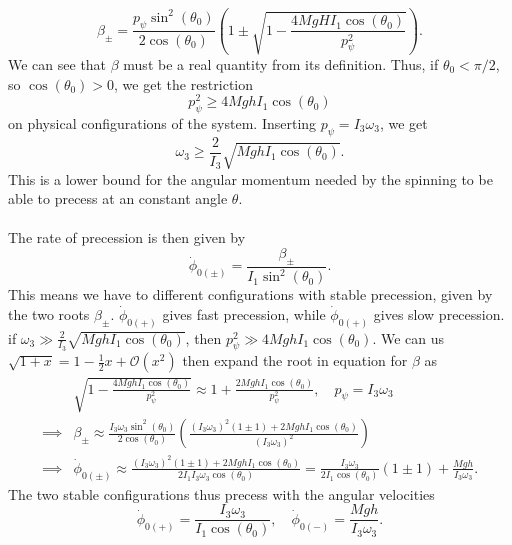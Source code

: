 \documentclass{article}
\begin{document}
        \begin{equation*}
            \beta_\pm = \frac{p_\psi \sin^2(\theta_0)}{2 \cos(\theta_0)} \left( 1 \pm \sqrt{1 - \frac{4 M g H I_1 \cos(\theta_0)}{p_\psi^2}} \right).
        \end{equation*}
        We can see that $\beta$ must be a real quantity from its definition. Thus, if $\theta_0 < \pi / 2$, so $\cos(\theta_0) > 0$, we get the restriction
        \begin{equation*}
            p_\psi^2 \geq 4 M g h I_1 \cos(\theta_0)
        \end{equation*}
        on physical configurations of the system. Inserting $p_\psi = I_3 \omega_3$, we get
        \begin{equation*}
            \omega_3 \geq \frac{2}{I_3} \sqrt{MghI_1 \cos(\theta_0)}.
        \end{equation*}
        This is a lower bound for the angular momentum needed by the spinning to be able to precess at an constant angle $\theta$. \\ \\
        The rate of precession is then given by
        \begin{equation*}
            \dot \phi_{0(\pm)} = \frac{\beta_\pm}{I_1 \sin^2(\theta_0)}.
        \end{equation*}
        This means we have to different configurations with stable precession, given by the two roots $\beta_\pm$. $\dot \phi_{0(+)}$ gives fast precession, while $\dot \phi_{0(+)}$ gives slow precession. if $\omega_3 \gg \frac{2}{I_3}\sqrt{MghI_1 \cos(\theta_0) }$, then $p_\psi^2 \gg 4 M g h I_1 \cos(\theta_0)$. We can us $\sqrt{1 + x} = 1 - \frac{1}{2} x + \mathcal{O}(x^2)$ then expand the root in equation for $\beta$ as
        \begin{align*}
            & \sqrt{1 - \frac{4 M g h I_1 \cos(\theta_0)}{p_\psi^2}} \approx 1 +\frac{2 M g h I_1 \cos(\theta_0)}{p_\psi^2}, \quad p_\psi = I_3 \omega_3  \\
            \implies &\beta_\pm \approx \frac{I_3 \omega_3 \sin^2(\theta_0)}{2 \cos(\theta_0)} \left(\frac{ (I_3 \omega_3 )^2 (1\pm 1) + 2 M g h I_1 \cos(\theta_0)}{(I_3 \omega_3)^2} \right) \\
            \implies & \dot \phi_{0(\pm)} \approx \frac{ (I_3 \omega_3 )^2(1\pm 1) + 2 M g h I_1 \cos(\theta_0)}{2 I_1 I_3 \omega_3 \cos(\theta_0)} = \frac{I_3 \omega_3}{2 I_1 \cos(\theta_0)} (1\pm 1) + \frac{Mgh}{I_3 \omega_3}.
        \end{align*}
        The two stable configurations thus precess with the angular velocities
        \begin{equation*}
            \dot \phi_{0(+)} = \frac{I_3 \omega_3}{I_1 \cos(\theta_0)}, \quad \dot \phi_{0(-)} = \frac{Mgh}{I_3 \omega_3}.
        \end{equation*}
\end{document}
